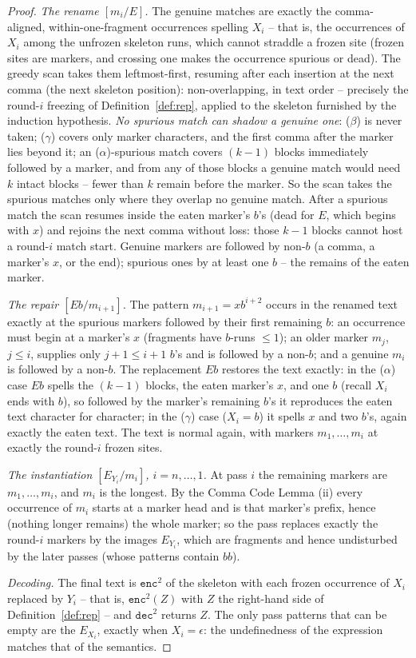 \documentclass[runningheads,envcountsect]{llncs}
\begin{document}
\begin{proof}
    \emph{The rename $[m_i/E]$.} The genuine matches are exactly the comma-aligned, within-one-fragment occurrences spelling $X_i$ -- that is, the occurrences of $X_i$ among the unfrozen skeleton runs, which cannot straddle a frozen site (frozen sites are markers, and crossing one makes the occurrence spurious or dead). The greedy scan takes them leftmost-first, resuming after each insertion at the next comma (the next skeleton position): non-overlapping, in text order -- precisely the round-$i$ freezing of Definition~\ref{def:rep}, applied to the skeleton furnished by the induction hypothesis. \emph{No spurious match can shadow a genuine one}: ($\beta$) is never taken; ($\gamma$) covers only marker characters, and the first comma after the marker lies beyond it; an ($\alpha$)-spurious match covers $(k-1)$ blocks immediately followed by a marker, and from any of those blocks a genuine match would need $k$ intact blocks -- fewer than $k$ remain before the marker. So the scan takes the spurious matches only where they overlap no genuine match. After a spurious match the scan resumes inside the eaten marker's $b$'s (dead for $E$, which begins with $x$) and rejoins the next comma without loss: those $k-1$ blocks cannot host a round-$i$ match start. Genuine markers are followed by non-$b$ (a comma, a marker's $x$, or the end); spurious ones by at least one $b$ -- the remains of the eaten marker.

    \emph{The repair $[E b/m_{i+1}]$.} The pattern $m_{i+1} = xb^{i+2}$ occurs in the renamed text exactly at the spurious markers followed by their first remaining $b$: an occurrence must begin at a marker's $x$ (fragments have $b$-runs $\leq 1$); an older marker $m_j$, $j \leq i$, supplies only $j + 1 \leq i + 1$ $b$'s and is followed by a non-$b$; and a genuine $m_i$ is followed by a non-$b$. The replacement $E b$ restores the text exactly: in the ($\alpha$) case $E b$ spells the $(k-1)$ blocks, the eaten marker's $x$, and one $b$ (recall $X_i$ ends with $b$), so followed by the marker's remaining $b$'s it reproduces the eaten text character for character; in the ($\gamma$) case ($X_i = b$) it spells $x$ and two $b$'s, again exactly the eaten text. The text is normal again, with markers $m_1, \dots, m_i$ at exactly the round-$i$ frozen sites.

    \emph{The instantiation $[E_{Y_i}/m_i]$, $i = n, \dots, 1$.} At pass $i$ the remaining markers are $m_1, \dots, m_i$, and $m_i$ is the longest. By the Comma Code Lemma (ii) every occurrence of $m_i$ starts at a marker head and is that marker's prefix, hence (nothing longer remains) the whole marker; so the pass replaces exactly the round-$i$ markers by the images $E_{Y_i}$, which are fragments and hence undisturbed by the later passes (whose patterns contain $bb$).

    \emph{Decoding.} The final text is $\mathtt{enc}^2$ of the skeleton with each frozen occurrence of $X_i$ replaced by $Y_i$ -- that is, $\mathtt{enc}^2(Z)$ with $Z$ the right-hand side of Definition~\ref{def:rep} -- and $\mathtt{dec}^2$ returns $Z$. The only pass patterns that can be empty are the $E_{X_i}$, exactly when $X_i = \epsilon$: the undefinedness of the expression matches that of the semantics.
\end{proof}
\end{document}

